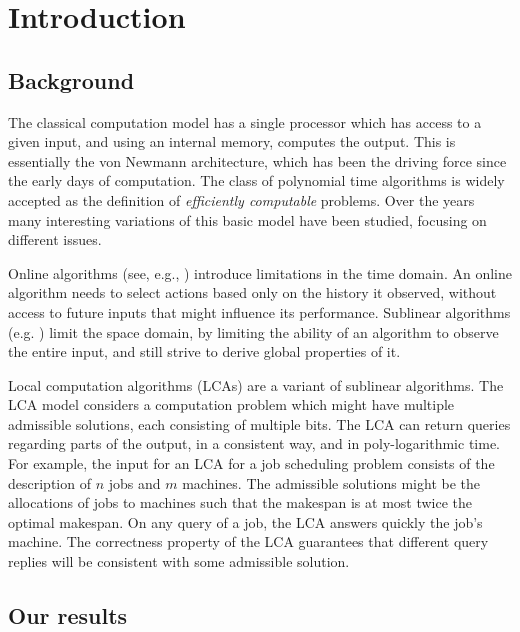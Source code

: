\documentclass[english, oribibl]{llncs}
\begin{document}
\section{Introduction}
\label{section:introduction}

\subsection{Background}
The classical computation model has a single processor which has
access to a given input, and using an internal memory, computes the
output. This is essentially the von Newmann architecture, which has
been the driving force since the early days of computation.
The class of polynomial time algorithms is widely accepted as the
definition of {\em efficiently computable} problems.
Over the years many interesting variations of this basic model have
been studied, focusing on different issues.




Online algorithms (see, e.g., \cite{BEY98}) introduce limitations in the time domain. An online
algorithm needs to select actions based only on the history it
observed, without access to future inputs that might influence its
performance. Sublinear algorithms (e.g. \cite{MR06, PR07}) limit the space domain, by
limiting the ability of an algorithm to observe the entire input,
and still strive to derive global properties of it.

Local computation algorithms (LCAs) \cite{RTVX11} are a variant of
sublinear algorithms.
The LCA model considers a computation problem which might have
multiple admissible solutions,  each consisting of multiple bits. The
LCA can return queries regarding parts of the output, in a consistent
way, and in poly-logarithmic time. For example, the input for an LCA
for a job scheduling problem consists of the description of $n$ jobs
and $m$ machines. The admissible solutions might be the allocations
of jobs to machines such that the makespan is at most twice the optimal
makespan. On any query of a job, the LCA answers quickly the job's machine.
The correctness property of the LCA guarantees that different query
replies will be consistent with some admissible solution.









\subsection{Our results}
\end{document}
